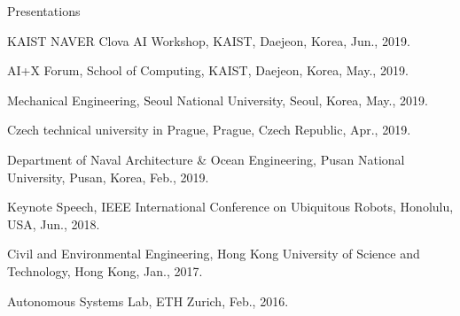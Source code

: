 \begin{rSection}{Presentations}

\begin{pubSubsection}{}
  \item KAIST NAVER Clova AI Workshop, KAIST, Daejeon, Korea, Jun., 2019.

  \item AI+X Forum, School of Computing, KAIST, Daejeon, Korea, May., 2019.


  \item Mechanical Engineering, Seoul National University, Seoul, Korea, May., 2019.

  \item Czech technical university in Prague, Prague, Czech Republic, Apr., 2019.

  \item Department of Naval Architecture \& Ocean Engineering, Pusan National University, Pusan, Korea, Feb., 2019.

  \item Keynote Speech, IEEE International Conference on Ubiquitous Robots, Honolulu, USA, Jun., 2018.


  \item Civil and Environmental Engineering, Hong Kong University of Science and Technology, Hong Kong, Jan., 2017.




  \item Autonomous Systems Lab, ETH Zurich, Feb., 2016.



\end{pubSubsection}
\end{rSection}
